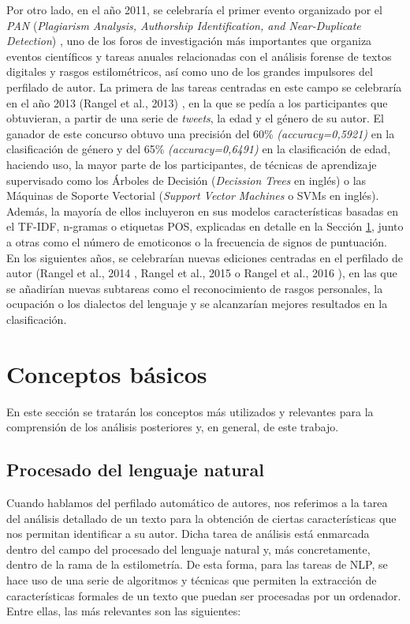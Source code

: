 \bigskip
Por otro lado, en el año 2011, se celebraría el primer evento organizado por el \textit{PAN} (\textit{Plagiarism Analysis, Authorship Identification, and Near-Duplicate Detection}) \cite{pan},
uno de los foros de investigación más importantes que organiza eventos científicos y tareas anuales relacionadas con el análisis forense de textos digitales
y rasgos estilométricos, así como uno de los grandes impulsores del perfilado de autor. La primera de las tareas centradas en este campo se celebraría en el año 2013 (Rangel et al., 2013) \cite{rangel2013overview},
en la que se pedía a los participantes que obtuvieran, a partir de una serie de \textit{tweets}, la edad y el género de su autor. El ganador de este concurso obtuvo una
precisión del 60\% \textit{(accuracy=0,5921)} en la clasificación de género y del 65\% \textit{(accuracy=0,6491)} en la clasificación de edad, haciendo uso, la mayor parte de los participantes, de técnicas de aprendizaje
supervisado como los Árboles de Decisión (\textit{Decission Trees} en inglés) o las Máquinas de Soporte Vectorial (\textit{Support Vector Machines} o SVMs en inglés).
Además, la mayoría de ellos incluyeron en sus modelos características basadas en el TF-IDF, n-gramas o etiquetas POS, explicadas en detalle en la Sección \ref{sec:conceptos_basicos},
junto a otras como el número de emoticonos o la frecuencia de signos de puntuación.
En los siguientes años, se celebrarían nuevas ediciones centradas en el perfilado de autor (Rangel et al., 2014 \cite{rangel2014overview}, Rangel et al., 2015 \cite{rangel2015overview} o
Rangel et al., 2016 \cite{rangel2016overview}), en las que se añadirían nuevas subtareas como el reconocimiento de rasgos personales, la ocupación o los dialectos del lenguaje y
se alcanzarían mejores resultados en la clasificación.

\section{Conceptos básicos}
\label{sec:conceptos_basicos}

En este sección se tratarán los conceptos más utilizados y relevantes para la comprensión de los análisis posteriores y, en general, de este trabajo.

\subsection{Procesado del lenguaje natural}
\label{sec:procesado_lenguaje_natural}

Cuando hablamos del perfilado automático de autores, nos referimos a la tarea del análisis detallado de un texto para la obtención de ciertas características
que nos permitan identificar a su autor.
Dicha tarea de análisis está enmarcada dentro del campo del procesado del lenguaje natural y, más concretamente,
dentro de la rama de la estilometría. De esta forma, para las tareas de NLP, se hace uso
de una serie de algoritmos y técnicas que permiten la extracción de características formales de un texto que puedan
ser procesadas por un ordenador. Entre ellas, las más relevantes son las siguientes:

